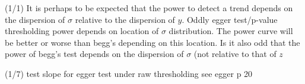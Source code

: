 \documentclass{article}
\begin{document}
(1/1) It is perhaps to be expected that the power to detect a trend
depends on the dispersion of $\sigma$ relative to the dispersion of
$y$. Oddly egger test/p-value thresholding power depends on location
of $\sigma$ distribution. The power curve will be better or worse than
begg's depending on this location. Is it also odd that the power
of begg's test depends on the dispersion of $\sigma$ (not relative to that of $z$

(1/7) test slope for egger test under raw thresholding see egger p 20
\end{document}
